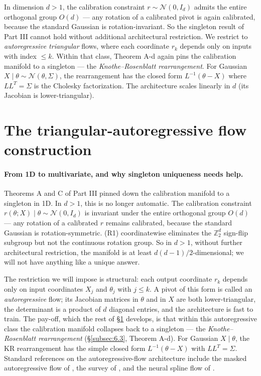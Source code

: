 \documentclass[11pt]{article}
\begin{document}
In dimension \(d > 1\), the calibration constraint
\(r \sim \mathcal{N}(0, I_d)\) admits the entire orthogonal group
\(O(d)\) --- any rotation of a calibrated pivot is again calibrated,
because the standard Gaussian is rotation-invariant. So the singleton
result of Part III cannot hold without additional architectural
restriction. We restrict to \emph{autoregressive triangular} flows,
where each coordinate \(r_k\) depends only on inputs with index
\(\le k\). Within that class, Theorem A-d again pins the calibration
manifold to a singleton --- the \emph{Knothe--Rosenblatt rearrangement}.
For Gaussian \(X \mid \theta \sim \mathcal{N}(\theta, \Sigma)\), the
rearrangement has the closed form \(L^{-1}(\theta - X)\) where
\(LL^T = \Sigma\) is the Cholesky factorization. The architecture
scales linearly in \(d\) (its Jacobian is lower-triangular).

\section{The triangular-autoregressive flow construction}\label{sec:6}

\paragraph{From 1D to multivariate, and why singleton uniqueness needs help.}
Theorems A and C of Part III pinned down the calibration manifold to a
singleton in 1D. In \(d > 1\), this is no longer automatic. The
calibration constraint \(r(\theta; X) \mid \theta \sim \mathcal{N}(0, I_d)\)
is invariant under the entire orthogonal group \(O(d)\) --- any rotation
of a calibrated \(r\) remains calibrated, because the standard Gaussian
is rotation-symmetric. (R1) coordinatewise eliminates the
\(\mathbb{Z}_2^d\) sign-flip subgroup but not the continuous rotation
group. So in \(d > 1\), without further architectural restriction, the
manifold is at least \(d(d-1)/2\)-dimensional; we will not have anything
like a unique answer.

The restriction we will impose is structural: each output coordinate
\(r_k\) depends only on input coordinates \(X_j\) and \(\theta_j\) with
\(j \le k\). A pivot of this form is called an \emph{autoregressive}
flow; its Jacobian matrices in \(\theta\) and in \(X\) are both
lower-triangular, the determinant is a product of \(d\) diagonal
entries, and the architecture is fast to train. The pay-off, which the
rest of \S\ref{sec:6} develops, is that within this autoregressive
class the calibration manifold collapses back to a singleton --- the
\emph{Knothe--Rosenblatt rearrangement} (\S\ref{subsec:6.3},
Theorem A-d). For Gaussian \(X \mid \theta\), the KR rearrangement has
the simple closed form \(L^{-1}(\theta - X)\) with \(LL^T = \Sigma\).
Standard references on the autoregressive-flow architecture include the
masked autoregressive flow of \citet{PapamakariosEtAl2017}, the survey
of \citet{PapamakariosEtAl2021}, and the neural spline flow of
\citet{DurkanEtAl2019}.
\end{document}
